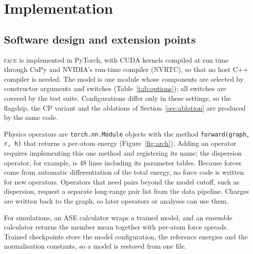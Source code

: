 \documentclass[journal=jctcce,manuscript=article,layout=traditional]{achemso}
\newcommand{\FACE}{\textup{\textsc{face}}}
\begin{document}
\section{Implementation}
\label{sec:implementation}

\subsection{Software design and extension points}
\FACE{} is implemented in PyTorch\cite{paszke2019pytorch}, with CUDA kernels compiled at run time through
CuPy\cite{okuta2017cupy} and NVIDIA's run-time compiler (NVRTC), so that no host C++ compiler is needed. The model is one module whose components
are selected by constructor arguments and switches (Table~\ref{tab:options}); all switches are covered by the test
suite. Configurations differ only in these settings, so the flagship, the CP variant and the ablations of
Section~\ref{sec:ablation} are produced by the same code.

Physics operators are \texttt{torch.nn.Module} objects with the method \texttt{forward(graph, r, h)} that returns a
per-atom energy (Figure~\ref{fig:arch}). Adding an operator requires implementing this one method and registering its
name; the dispersion operator, for example, is 48 lines including its parameter tables. Because forces come from
automatic differentiation of the total energy, no force code is written for new operators. Operators that need
pairs beyond the model cutoff, such as dispersion, request a separate long-range pair list from the data pipeline.
Charges are written back to the graph, so later operators or analyses can use them.

For simulations, an ASE\cite{larsen2017ase} calculator wraps a trained model, and an ensemble calculator returns the
member mean together with per-atom force spreads. Trained checkpoints store the model configuration, the
reference energies and the normalisation constants, so a model is restored from one file.
\end{document}

